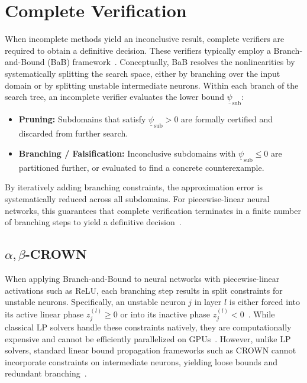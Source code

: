 \section{Complete Verification}
\label{sec:comp-verification}
When incomplete methods yield an inconclusive result, complete verifiers are required to obtain a definitive decision. 
These verifiers typically employ a Branch-and-Bound (BaB) framework~\cite{bunelUnifiedViewPiecewise2018,wang2021beta}. 
Conceptually, BaB resolves the nonlinearities by systematically splitting the search space, 
either by branching over the input domain or by splitting unstable intermediate neurons. 
Within each branch of the search tree, an incomplete verifier evaluates the lower bound $\underline{\psi}_{\mathrm{sub}}$:
\begin{itemize}
    \item \textbf{Pruning:} 
        Subdomains that satisfy $\underline{\psi}_{\mathrm{sub}} > 0$ are formally certified and discarded from further search.
    \item \textbf{Branching / Falsification:} 
        Inconclusive subdomains with $\underline{\psi}_{\mathrm{sub}} \le 0$ are partitioned further, 
        or evaluated to find a concrete counterexample.
\end{itemize}
By iteratively adding branching constraints, the approximation error is systematically reduced across all subdomains. 
For piecewise-linear neural networks, this guarantees that complete verification terminates in a finite number of branching 
steps to yield a definitive decision~\cite{bunelUnifiedViewPiecewise2018,wang2021beta}.



\subsection{\texorpdfstring{$\alpha,\beta$}{α,β}-CROWN}
\label{subsec:alpha-beta-crown}
When applying Branch-and-Bound to neural networks with piecewise-linear activations such as ReLU, 
each branching step results in split constraints for unstable neurons. Specifically, an unstable neuron 
$j$ in layer $l$ is either forced into its active linear phase $z_j^{(l)} \ge 0$ or into its inactive phase 
$z_j^{(l)} < 0$~\cite{wang2021beta}. While classical LP solvers handle these constraints natively, 
they are computationally expensive and cannot be efficiently parallelized on GPUs~\cite{bunelUnifiedViewPiecewise2018}. 
However, unlike LP solvers, standard linear bound propagation frameworks such as CROWN cannot incorporate constraints 
on intermediate neurons, yielding loose bounds and redundant branching~\cite{xuFastCompleteEnabling2021,wang2021beta}.

